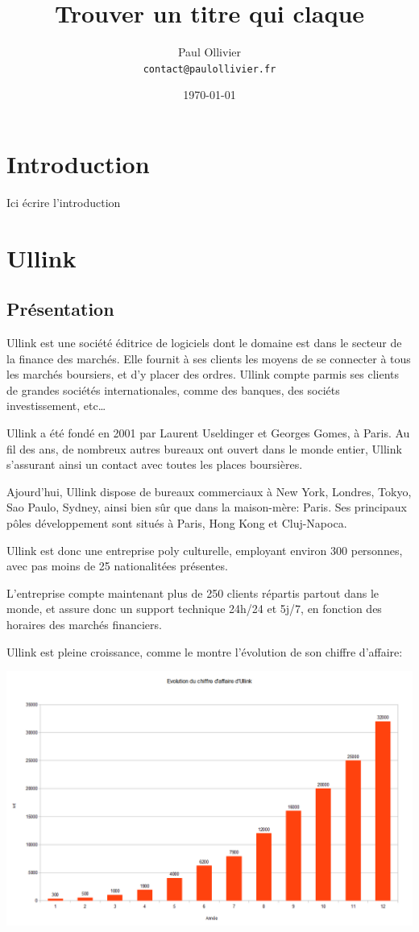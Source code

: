 \documentclass[a4paper, 12pt]{article}
\author{Paul Ollivier\\
\texttt{contact@paulollivier.fr}}
\title{Trouver un titre qui claque}
\date{\today}
\begin{document}
\maketitle
\pagebreak

\section*{Introduction}

Ici écrire l'introduction
\pagebreak
\tableofcontents
\pagebreak
\section{Ullink}
\subsection{Présentation}
Ullink est une société éditrice de logiciels dont le domaine est dans le secteur de la finance des marchés. Elle fournit à ses clients les moyens de se connecter à tous les marchés boursiers, et d'y placer des ordres. Ullink compte parmis ses clients de grandes sociétés internationales, comme des banques, des sociéts investissement, etc\dots

Ullink a été fondé en 2001 par Laurent Useldinger et Georges Gomes, à Paris. Au fil des ans, de nombreux autres bureaux ont ouvert dans le monde entier, Ullink s'assurant ainsi un contact avec toutes les places boursières.

Ajourd'hui, Ullink dispose de bureaux commerciaux à New York, Londres, Tokyo, Sao Paulo, Sydney, ainsi bien sûr que dans la maison-mère: Paris. Ses principaux pôles développement sont situés à Paris, Hong Kong et Cluj-Napoca.

Ullink est donc une entreprise poly culturelle, employant environ 300 personnes, avec pas moins de 25 nationalitées présentes.

L'entreprise compte maintenant plus de 250 clients répartis partout dans le monde, et assure donc un support technique 24h/24 et 5j/7, en fonction des horaires des marchés financiers.

Ullink est pleine croissance, comme le montre l'évolution de son chiffre d'affaire:

\includegraphics[width=\textwidth]{ca_ullink.png}
\end{document}
